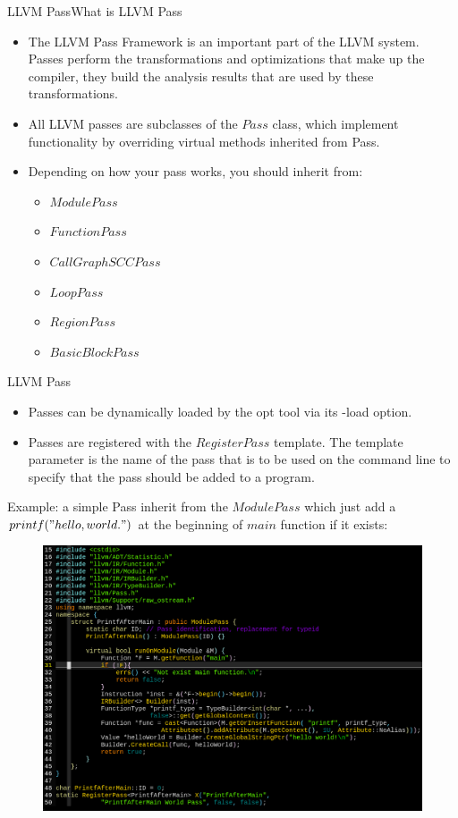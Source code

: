 \documentclass{beamer}
\begin{document}
\begin{frame}{LLVM Pass}{What is LLVM Pass}
  \begin{itemize}
	\item 
  The LLVM Pass Framework is an important part of the LLVM system. Passes perform the transformations and optimizations that make up the compiler, they build the analysis results that are used by these transformations.
\item All LLVM passes are subclasses of the $Pass$ class, which implement functionality by overriding virtual methods inherited from Pass.
  \item Depending on how your pass works, you should inherit from:
	\begin{itemize}
	  \item  $ModulePass$
		\item $FunctionPass$
		  \item  $CallGraphSCCPass$
			\item  $LoopPass$
			  \item  $RegionPass$
				\item $BasicBlockPass$
	\end{itemize}
  \end{itemize}
\end{frame}

\begin{frame}{LLVM Pass}
  \begin{itemize}
\setlength{\itemsep}{0.5cm}
	  \item Passes can be dynamically loaded by the opt tool via its -load option.
	\item Passes are registered with the $RegisterPass$ template. The template parameter is the name of the pass that is to be used on the command line to specify that the pass should be added to a program.
  \end{itemize}
\end{frame}

\begin{frame}
  Example: a simple Pass inherit from the $ModulePass$ which just add a $printf("hello, world.")$ at the beginning of $main$ function if it exists:
  \begin{figure}[H]
	\centering
	\includegraphics[scale=0.25]{./fig/pass.png}
  \end{figure}
\end{frame}
\end{document}
